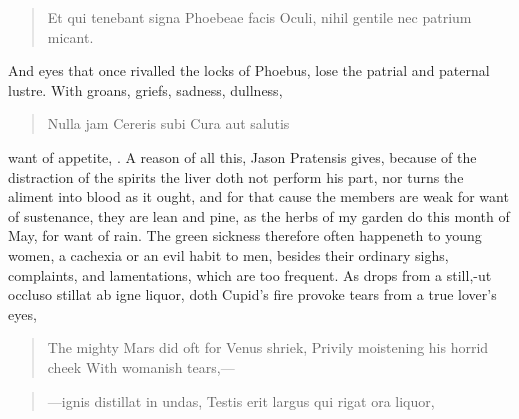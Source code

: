 \begin{latin}
\begin{verse}
Et qui tenebant signa Phoebeae facis
Oculi, nihil gentile nec patrium micant.
\end{verse}
\end{latin}

And eyes that once rivalled the locks of Phoebus, lose the patrial and
paternal lustre. With groans, griefs, sadness, dullness,

\begin{latin}
\begin{verse}
Nulla jam Cereris subi
Cura aut salutis
\end{verse}
\end{latin}

want of appetite, \etc{}. A reason of all this, Jason Pratensis
gives, because of the distraction of the spirits the liver doth not
perform his part, nor turns the aliment into blood as it ought, and for
that cause the members are weak for want of sustenance, they are lean
and pine, as the herbs of my garden do this month of May, for want of
rain. The green sickness therefore often happeneth to young women, a
cachexia or an evil habit to men, besides their ordinary sighs,
complaints, and lamentations, which are too frequent. As drops from a
still,-ut occluso stillat ab igne liquor, doth Cupid's fire provoke
tears from a true lover's eyes,

\begin{verse}%
The mighty Mars did oft for Venus shriek,
Privily moistening his horrid cheek
With womanish tears,---
\end{verse}%

\begin{latin}
\begin{verse}
---ignis distillat in undas,
Testis erit largus qui rigat ora liquor,
\end{verse}
\end{latin}

